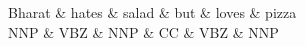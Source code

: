 \documentclass{article}
\begin{document}
\thispagestyle{empty}
\begin{center}
 \begin{dependency}[theme = default]
   \begin{deptext}[column sep=1em]
   Bharat \& hates \& salad \& but \& loves \& pizza \\
   NNP \& VBZ \& NNP \& CC \& VBZ \& NNP \\
   \end{deptext}
\end{dependency} \\
\end{center}
\end{document}
